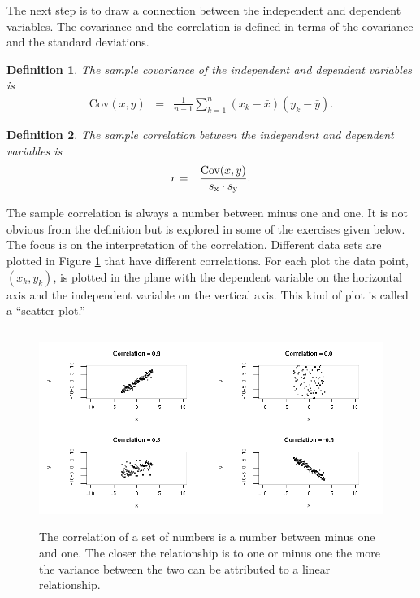 \documentclass[12pt]{article}
\newtheorem{definition}{Definition}[section]
\begin{document}
The next step is to draw a connection between the independent and
dependent variables. The covariance and the correlation is defined in
terms of the covariance and the standard deviations.

\begin{definition}
  The sample covariance of the independent and dependent variables is
  \begin{eqnarray}
    \label{eqn:covariance}
    \mathrm{Cov}(x,y) & = & \frac{1}{n-1} \sum^n_{k=1} (x_k-\bar{x})(y_k-\bar{y}).
  \end{eqnarray}
\end{definition}

\begin{definition}
  The sample correlation between the independent and dependent variables is
  \begin{eqnarray*}
    r & = & \frac{\mathrm{Cov}(x,y)}{s_{\rm x} \cdot s_{\rm y}}.
  \end{eqnarray*}
\end{definition}

The sample correlation is always a number between minus one and one.
It is not obvious from the definition but is explored in some of the
exercises given below. The focus is on the interpretation of the
correlation. Different data sets are plotted in Figure
\ref{fig:correlation} that have different correlations. For each plot
the data point, $(x_k,y_k)$, is plotted in the plane with the
dependent variable on the horizontal axis and the independent variable
on the vertical axis. This kind of plot is called a ``scatter plot.''


\begin{figure}[tb]
  \centerline{\includegraphics[height=2.5in]{correlation}}
  \caption{The correlation of a set of numbers is a number between
    minus one and one. The closer the relationship is to one or minus
    one the more the variance between the two can be attributed to a
    linear relationship.}
  \label{fig:correlation}
\end{figure}
\end{document}
